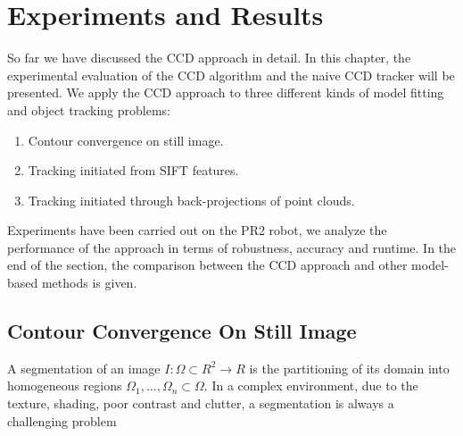 \chapter{Experiments and Results}
\label{chapter:experiments}

So far we have discussed the CCD approach in detail. In this chapter,
the experimental evaluation of the CCD algorithm and the naive CCD
tracker will be presented. We apply the CCD approach to three
different kinds of model fitting and object tracking problems:

\begin{enumerate}
\item Contour convergence on still image.
\item Tracking initiated from SIFT features.
\item Tracking initiated through back-projections of point clouds.
\end{enumerate}

Experiments have been carried out on the PR2 robot, we analyze the performance
of the approach in terms of robustness, accuracy and runtime. In the
end of the section, the comparison between the CCD approach and  other
model-based methods is given.



\section{Contour Convergence On Still Image}
\label{sec:ES}


A segmentation of an image $I: \Omega \subset R^2 \longrightarrow R$
is the partitioning of its domain into homogeneous regions
$\Omega_1,\ldots, \Omega_n \subset \Omega$. In a complex environment,
due to the texture, shading, poor contrast and clutter, a segmentation is
always a challenging problem %


